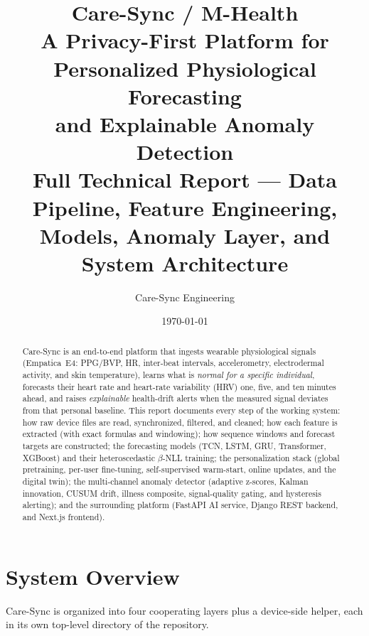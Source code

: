 \documentclass[11pt,a4paper]{article}
\title{\textbf{Care-Sync / M-Health}\\[4pt]
\large A Privacy-First Platform for Personalized Physiological Forecasting\\
and Explainable Anomaly Detection\\[6pt]
\normalsize Full Technical Report --- Data Pipeline, Feature Engineering,\\
Models, Anomaly Layer, and System Architecture}
\author{Care-Sync Engineering}
\date{\today}
\begin{document}
\maketitle
\begin{abstract}
\noindent
Care-Sync is an end-to-end platform that ingests wearable physiological signals
(Empatica~E4: PPG/BVP, HR, inter-beat intervals, accelerometry, electrodermal
activity, and skin temperature), learns what is \emph{normal for a specific
individual}, forecasts their heart rate and heart-rate variability (HRV) one,
five, and ten minutes ahead, and raises \emph{explainable} health-drift alerts
when the measured signal deviates from that personal baseline. This report
documents every step of the working system: how raw device files are read,
synchronized, filtered, and cleaned; how each feature is extracted (with exact
formulas and windowing); how sequence windows and forecast targets are
constructed; the forecasting models (TCN, LSTM, GRU, Transformer, XGBoost) and
their heteroscedastic $\beta$-NLL training; the personalization stack (global
pretraining, per-user fine-tuning, self-supervised warm-start, online updates,
and the digital twin); the multi-channel anomaly detector (adaptive z-scores,
Kalman innovation, CUSUM drift, illness composite, signal-quality gating, and
hysteresis alerting); and the surrounding platform (FastAPI AI service, Django
REST backend, and Next.js frontend).
\end{abstract}

\tableofcontents
\newpage

\section{System Overview}

Care-Sync is organized into four cooperating layers plus a device-side helper,
each in its own top-level directory of the repository.
\end{document}
